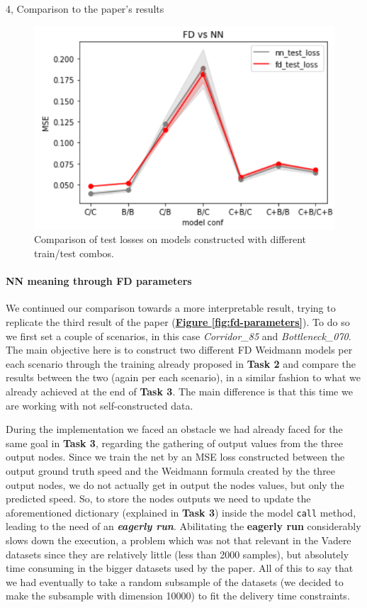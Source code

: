 \documentclass[10pt,a4paper]{article}
\begin{document}
\begin{task}{4, Comparison to the paper's results}
\begin{figure}[h]
    \centering
    \includegraphics[scale=0.85]{images/fdvsnn.png}
    \caption{Comparison of test losses on models constructed with different train/test combos.}
    \label{fig:fdvsnn}
\end{figure}

\paragraph{NN meaning through FD parameters}
We continued our comparison towards a more interpretable result, trying to replicate the third result of the paper (\textbf{\hyperref[fig:fd-parameters]{Figure \ref{fig:fd-parameters}}}). To do so we first set a couple of scenarios, in this case \textit{Corridor\_85} and \textit{Bottleneck\_070}. The main objective here is to construct two different FD Weidmann models per each scenario through the training already proposed in \textbf{Task 2} and compare the results between the two (again per each scenario), in a similar fashion to what we already achieved at the end of \textbf{Task 3}. The main difference is that this time we are working with not self-constructed data.

During the implementation we faced an obstacle we had already faced for the same goal in \textbf{Task 3}, regarding the gathering of output values from the three output nodes. Since we train the net by an MSE loss constructed between the output ground truth speed and the Weidmann formula created by the three output nodes, we do not actually get in output the nodes values, but only the predicted speed. So, to store the nodes outputs we need to update the aforementioned dictionary (explained in \textbf{Task 3}) inside the model \texttt{call} method, leading to the need of an \textit\textbf{eagerly run}. Abilitating the \textbf{eagerly run} considerably slows down the execution, a problem which was not that relevant in the Vadere datasets since they are relatively little (less than 2000 samples), but absolutely time consuming in the bigger datasets used by the paper. All of this to say that we had eventually to take a random subsample of the datasets (we decided to make the subsample with dimension 10000) to fit the delivery time constraints.


\end{task}
\end{document}

